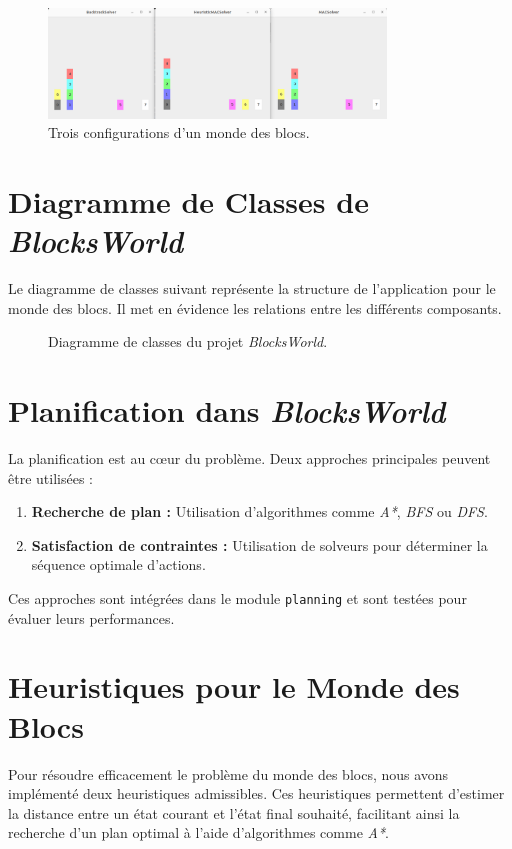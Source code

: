 \documentclass[a4paper,12pt]{article} %
\begin{document}
\begin{figure}[h]
    \centering
    \includegraphics[width=0.8\textwidth]{ex.png}
    \caption{Trois configurations d’un monde des blocs.}
\end{figure}

\section{Diagramme de Classes de \emph{BlocksWorld}}
Le diagramme de classes suivant représente la structure de l'application pour le monde des blocs. Il met en évidence les relations entre les différents composants.

\begin{figure}[h]
    \centering
    \caption{Diagramme de classes du projet \emph{BlocksWorld}.}
\end{figure}

\section{Planification dans \emph{BlocksWorld}}
La planification est au cœur du problème. Deux approches principales peuvent être utilisées :

\begin{enumerate}
    \item \textbf{Recherche de plan :} Utilisation d'algorithmes comme \emph{A*}, \emph{BFS} ou \emph{DFS}.
    \item \textbf{Satisfaction de contraintes :} Utilisation de solveurs pour déterminer la séquence optimale d'actions.
\end{enumerate}

Ces approches sont intégrées dans le module \texttt{planning} et sont testées pour évaluer leurs performances.

\section{Heuristiques pour le Monde des Blocs}
Pour résoudre efficacement le problème du monde des blocs, nous avons implémenté deux heuristiques admissibles. Ces heuristiques permettent d'estimer la distance entre un état courant et l'état final souhaité, facilitant ainsi la recherche d'un plan optimal à l'aide d'algorithmes comme \emph{A*}. 
\end{document}
